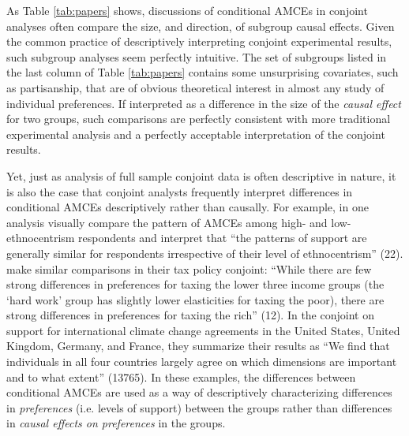 \documentclass[a4paper,12pt]{article}\usepackage[]{graphicx}\usepackage[]{color}
\begin{document}
As Table \ref{tab:papers} shows, discussions of conditional AMCEs in conjoint analyses often compare the size, and direction, of subgroup causal effects. Given the common practice of descriptively interpreting conjoint experimental results, such subgroup analyses seem perfectly intuitive. The set of subgroups listed in the last column of Table \ref{tab:papers} contains some unsurprising covariates, such as partisanship, that are of obvious theoretical interest in almost any study of individual preferences. If interpreted as a difference in the size of the \textit{causal effect} for two groups, such comparisons are perfectly consistent with more traditional experimental analysis and a perfectly acceptable interpretation of the conjoint results.

Yet, just as analysis of full sample conjoint data is often descriptive in nature, it is also the case that conjoint analysts frequently interpret differences in conditional AMCEs descriptively rather than causally. For example, in one analysis \citet{HainmuellerHopkinsYamamoto2014} visually compare the pattern of AMCEs among high- and low-ethnocentrism respondents and interpret that ``the patterns of support are generally similar for respondents irrespective of their level of ethnocentrism'' (22). \citet{BallardRosaMartinScheve2016} make similar comparisons in their tax policy conjoint: ``While there are few strong differences in preferences for taxing the lower three income groups (the `hard work' group has slightly lower elasticities for taxing the poor), there are strong differences in preferences for taxing the rich'' (12). In the \citet{BechtelScheve2013} conjoint on support for international climate change agreements in the United States, United Kingdom, Germany, and France, they summarize their results as ``We find that individuals in all four countries largely agree on which dimensions are important and to what extent'' (13765). In these examples, the differences between conditional AMCEs are used as a way of descriptively characterizing differences in \textit{preferences} (i.e. levels of support) between the groups rather than differences in \textit{causal effects on preferences} in the groups.
\end{document}
